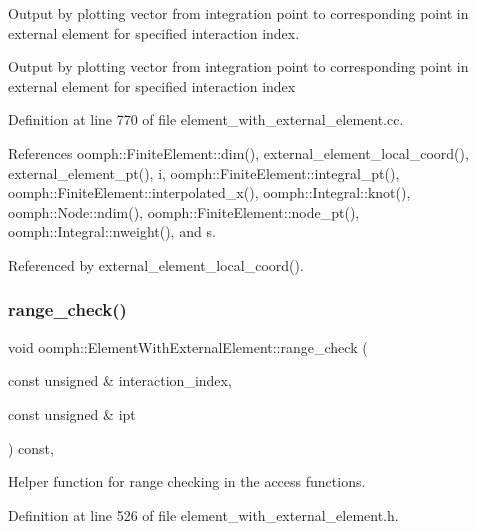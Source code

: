 Output by plotting vector from integration point to corresponding point in external element for specified interaction index. 

Output by plotting vector from integration point to corresponding point in external element for specified interaction index 

Definition at line 770 of file element\+\_\+with\+\_\+external\+\_\+element.\+cc.



References oomph\+::\+Finite\+Element\+::dim(), external\+\_\+element\+\_\+local\+\_\+coord(), external\+\_\+element\+\_\+pt(), i, oomph\+::\+Finite\+Element\+::integral\+\_\+pt(), oomph\+::\+Finite\+Element\+::interpolated\+\_\+x(), oomph\+::\+Integral\+::knot(), oomph\+::\+Node\+::ndim(), oomph\+::\+Finite\+Element\+::node\+\_\+pt(), oomph\+::\+Integral\+::nweight(), and s.



Referenced by external\+\_\+element\+\_\+local\+\_\+coord().

\mbox{\label{classoomph_1_1ElementWithExternalElement_a78d8fa19cbc1279a8aeb1756ce64c0df}} 
\subsubsection{\texorpdfstring{range\+\_\+check()}{range\_check()}}
{\footnotesize\ttfamily void oomph\+::\+Element\+With\+External\+Element\+::range\+\_\+check (\begin{DoxyParamCaption}\item[{const unsigned \&}]{interaction\+\_\+index,  }\item[{const unsigned \&}]{ipt }\end{DoxyParamCaption}) const\hspace{0.3cm}{\ttfamily [inline]}, {\ttfamily [private]}}



Helper function for range checking in the access functions. 



Definition at line 526 of file element\+\_\+with\+\_\+external\+\_\+element.\+h.



